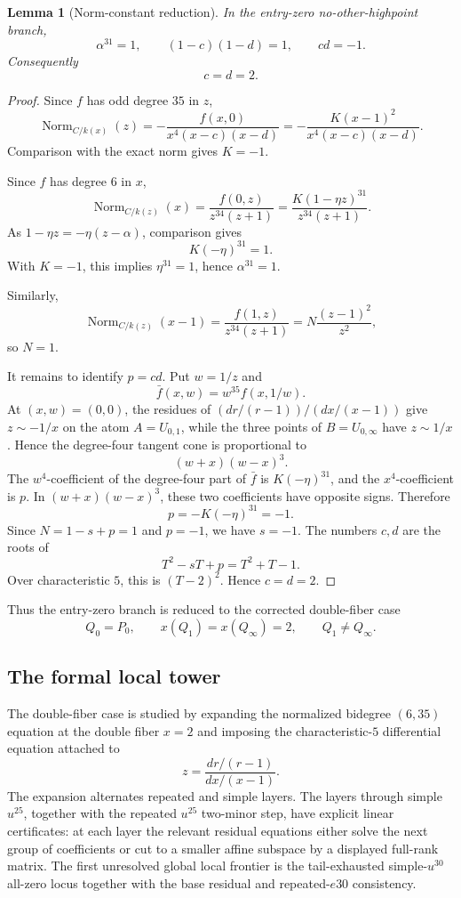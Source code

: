 \documentclass[11pt]{amsart}
\newtheorem{lemma}[theorem]{Lemma}
\newcommand{\Norm}{\operatorname{Norm}}
\begin{document}
\begin{lemma}[Norm-constant reduction]
\label{lem:cd2}
In the entry-zero no-other-highpoint branch,
\[
  \alpha^{31}=1,\qquad (1-c)(1-d)=1,\qquad cd=-1.
\]
Consequently
\[
  c=d=2.
\]
\end{lemma}

\begin{proof}
Since \(f\) has odd degree \(35\) in \(z\),
\[
  \Norm_{C/k(x)}(z)=
  -\frac{f(x,0)}{x^4(x-c)(x-d)}
  =
  -\frac{K(x-1)^2}{x^4(x-c)(x-d)}.
\]
Comparison with the exact norm gives \(K=-1\).

Since \(f\) has degree \(6\) in \(x\),
\[
  \Norm_{C/k(z)}(x)=
  \frac{f(0,z)}{z^{34}(z+1)}
  =
  \frac{K(1-\eta z)^{31}}{z^{34}(z+1)}.
\]
As \(1-\eta z=-\eta(z-\alpha)\), comparison gives
\[
  K(-\eta)^{31}=1.
\]
With \(K=-1\), this implies \(\eta^{31}=1\), hence \(\alpha^{31}=1\).

Similarly,
\[
  \Norm_{C/k(z)}(x-1)=
  \frac{f(1,z)}{z^{34}(z+1)}
  =
  N\frac{(z-1)^2}{z^2},
\]
so \(N=1\).

It remains to identify \(p=cd\).  Put \(w=1/z\) and
\[
  \bar f(x,w)=w^{35}f(x,1/w).
\]
At \((x,w)=(0,0)\), the residues of
\((dr/(r-1))/(dx/(x-1))\) give \(z\sim -1/x\) on the atom
\(A=U_{0,1}\), while the three points of \(B=U_{0,\infty}\) have
\(z\sim 1/x\).  Hence the degree-four
tangent cone is proportional to
\[
  (w+x)(w-x)^3.
\]
The \(w^4\)-coefficient of the degree-four part of \(\bar f\) is
\(K(-\eta)^{31}\), and the \(x^4\)-coefficient is \(p\).  In
\((w+x)(w-x)^3\), these two coefficients have opposite signs.  Therefore
\[
  p=-K(-\eta)^{31}=-1.
\]
Since \(N=1-s+p=1\) and \(p=-1\), we have \(s=-1\).  The numbers \(c,d\) are
the roots of
\[
  T^2-sT+p=T^2+T-1.
\]
Over characteristic \(5\), this is \((T-2)^2\).  Hence \(c=d=2\).
\end{proof}

Thus the entry-zero branch is reduced to the corrected double-fiber case
\[
  Q_0=P_0,\qquad x(Q_1)=x(Q_\infty)=2,\qquad Q_1\ne Q_\infty.
\]

\subsection{The formal local tower}

The double-fiber case is studied by expanding the normalized bidegree
\((6,35)\) equation at the double fiber \(x=2\) and imposing the
characteristic-\(5\) differential equation attached to
\[
  z=\frac{dr/(r-1)}{dx/(x-1)}.
\]
The expansion alternates repeated and simple layers.  The layers through
simple \(u^{25}\), together with the repeated \(u^{25}\) two-minor step, have
explicit linear certificates: at each layer the relevant residual equations
either solve the next group of coefficients or cut to a smaller affine
subspace by a displayed full-rank matrix.  The first unresolved global local
frontier is the tail-exhausted simple-\(u^{30}\) all-zero locus together with
the base residual and repeated-\(e30\) consistency.
\end{document}
